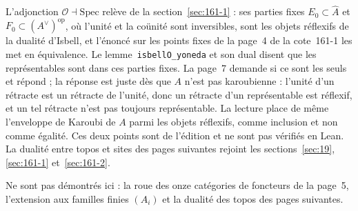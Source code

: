 \begin{remarque}
L'adjonction $\mathcal O \dashv \mathrm{Spec}$ relève de la section~\ref{sec:161-1} : ses parties fixes $E_0 \subset \widehat A$ et $F_0 \subset (A^\vee)^{\mathrm{op}}$, où l'unité et la coünité sont inversibles, sont les objets réflexifs de la dualité d'Isbell, et l'énoncé sur les points fixes de la page~4 de la cote~161-1 les met en équivalence. Le lemme~\texttt{isbellO\_yoneda} et son dual disent que les représentables sont dans ces parties fixes. La page~7 demande si ce sont les seuls et répond  ; la réponse est juste dès que $A$ n'est pas karoubienne : l'unité d'un rétracte est un rétracte de l'unité, donc un rétracte d'un représentable est réflexif, et un tel rétracte n'est pas toujours représentable. La lecture place de même l'enveloppe de Karoubi de $A$ parmi les objets réflexifs, comme inclusion et non comme égalité. Ces deux points sont de l'édition et ne sont pas vérifiés en Lean. La dualité entre topos et sites des pages suivantes rejoint les sections~\ref{sec:19}, \ref{sec:161-1} et~\ref{sec:161-2}.
\end{remarque}

Ne sont pas démontrés ici : la roue des onze catégories de foncteurs de la page~5, l'extension aux familles finies $(A_i)$ et la dualité des topos des pages suivantes.
